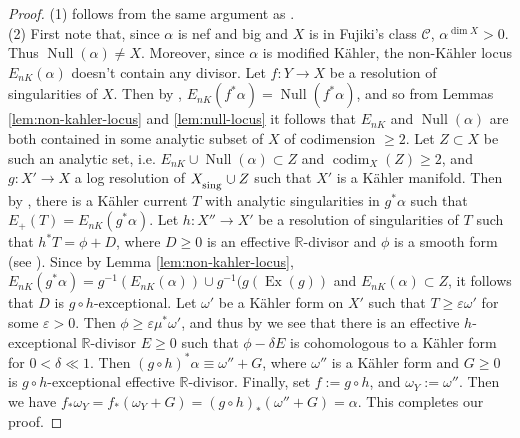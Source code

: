 \documentclass[12pt]{amsart}
\theoremstyle{plain}
\theoremstyle{remark}
\theoremstyle{definition}
\def\ve{\varepsilon}
\def\Null{\operatorname{Null}}
\newcommand{\<}{\leq}
\def\>{\geq}
\newcommand{\mbR}{\mathbb{R}}
\def\>{\geq}
\def\ve{\varepsilon}
\def\mcC{\mathcal{C}}
\def\Ex{\operatorname{Ex}}
\def\dim{\operatorname{dim}}
\def\codim{\operatorname{codim}}
\def\sing{\operatorname{\textsubscript{sing}}}
\theoremstyle{definition}
\theoremstyle{definition}
\numberwithin{equation}{section}
\theoremstyle{remark}
\begin{document}
\begin{proof}
    (1) follows from the same argument as \cite[Proposition 2.3]{Bou04}.\\
    
    (2) First note that, since $\alpha$ is nef and big and $X$ is in Fujiki's class $\mcC$, $\alpha^{\dim X}>0$. Thus $\Null(\alpha)\neq X$. Moreover, since $\alpha$ is modified K\"ahler, the non-K\"ahler locus $E_{nK}(\alpha)$ doesn't contain any divisor. Let $f:Y\to X$ be a resolution of singularities of $X$. Then by \cite[Theorem 1.1]{CT15}, $E_{nK}(f^*\alpha)=\Null(f^*\alpha)$, and so from Lemmas \ref{lem:non-kahler-locus} and \ref{lem:null-locus} it follows that $E_{nK}$ and $\Null(\alpha)$ are both contained in some analytic subset of $X$ of codimension $\>2$. Let $Z\subset X$ be such an analytic set, i.e. $E_{nK}\cup\Null(\alpha)\subset Z$ and $\codim_X(Z)\>2$,  and $g:X'\to X$ a log resolution of $X_{\sing}\cup Z$ such that $X'$ is a K\"ahler manifold. Then by \cite[Theorem 3.17(ii)]{Bou04}, there is a K\"ahler current $T$ with analytic singularities in $g^*\alpha$ such that $E_+(T)=E_{nK}(g^*\alpha)$. Let $h:X''\to X'$ be a resolution of singularities of $T$ such that $h^*T=\phi+D$, where $D\>0$ is an effective $\mbR$-divisor and $\phi$ is a smooth form (see \cite[Definition 2.5.1]{Bou04}). Since by Lemma \ref{lem:non-kahler-locus}, $E_{nK}(g^*\alpha)=g^{-1}(E_{nK}(\alpha))\cup g^{-1}(g(\Ex(g))$ and $E_{nK}(\alpha)\subset Z$, it follows that $D$ is $g\circ h$-exceptional. Let $\omega'$ be a K\"ahler form on $X'$ such that $T\geq \ve\omega'$ for some $\ve>0$. Then $\phi\geq \ve\mu^*\omega'$, and thus by \cite[Lemma 2.9]{Bou02ar} we see that there is an effective $h$-exceptional $\mbR$-divisor $E\>0$ such that $\phi -\delta E$ is cohomologous to a K\"ahler form for $0<\delta \ll 1$. Then $(g \circ h) ^*\alpha \equiv \omega '' +G$, where $\omega ''$ is a K\"ahler form and $G\geq 0$ is $g \circ h$-exceptional effective $\mbR$-divisor.  Finally, set $f:=g\circ h$, and $\omega_Y:=\omega''$. Then we have $f_*\omega_Y=f_*(\omega_Y+G)=(g\circ h)_*(\omega''+G)=\alpha$. This completes our proof.  
 \end{proof}
\end{document}
